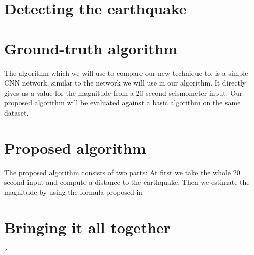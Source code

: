 \documentclass[thesis.tex]{subfiles}
\begin{document}
\section{Detecting the earthquake}

\section{Ground-truth algorithm}
The algorithm which we will use to compare our new technique to, is a simple CNN network, similar to the network we will use in our algorithm. It directly gives us a value for the magnitude from a 20 second seismometer input.
Our proposed algorithm will be evaluated against a basic algorithm on the same dataset. 
\section{Proposed algorithm}
The proposed algorithm consists of two parts: At first we take the whole 20 second input and compute a distance to the earthquake. Then we estimate the magnitude by using the formula proposed in  

\section{Bringing it all together}
´
\subfilebib %
\end{document}
